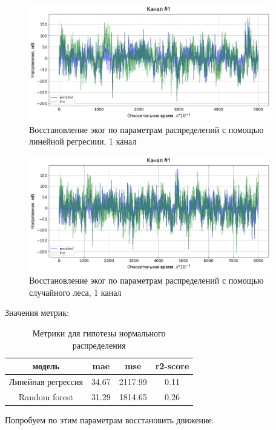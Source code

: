 \documentclass{mipt-thesis-bs}
\begin{document}
\begin{figure}
\begin{center}
	\includegraphics[width=300pt,height=\textheight,keepaspectratio]{imgs/ecog_by_params_lr.png}
	\caption{Восстановление эког по параметрам распределений с помощью линейной регресиии, 1 канал}	
	\label{fig:lr ecog}
	\end{center}
\end{figure}

\begin{figure}
\begin{center}
\includegraphics[width=300pt,height=\textheight,keepaspectratio]{imgs/ecog_by_params_rf.png}
\caption{Восстановление эког по параметрам распределений с помощью случайного леса, 1 канал}	
	\label{fig:rf ecog}
	\end{center}
\end{figure}


Значения метрик:
\begin{table}[h]
  
  \centering
    \begin{tabular}{ | c | c | c | c | }
	\hline
	модель&mae & mse & r2-score \\ \hline
	Линейная регрессия &34.67 & 2117.99 & 0.11 \\
	Random forest &31.29 & 1814.65 & 0.26\\
	\hline
	\end{tabular}
\caption{Метрики для гипотезы нормального распределения}
\label{table:lr/rf ecog}
\end{table}
Попробуем по этим параметрам восстановить движение:
\end{document}
